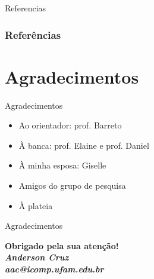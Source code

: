\documentclass{beamer}
\begin{document}
\begin{frame}{Referencias}
\frametitle{Referências}
    \tiny{ }
    
\end{frame}


\section{Agradecimentos}
\begin{frame}{Agradecimentos}
\begin{itemize}
 \item Ao orientador: prof. Barreto
\item À banca: prof. Elaine e prof. Daniel
\item À minha esposa: Giselle
\item Amigos do grupo de pesquisa
\item À plateia
\end{itemize}

\end{frame}

  \begin{frame}{Agradecimentos}
  \begin{center}
 
  \textcolor{VerdeUFAM}{\Large \textbf{Obrigado pela sua atenção!}} \\
  \vspace*{20px}
  \textit{\textbf{Anderson Cruz}} \\
  \textit{\textbf{aac@icomp.ufam.edu.br}}
 
  \end{center}
  \end{frame}

 
 
 
\end{document}

